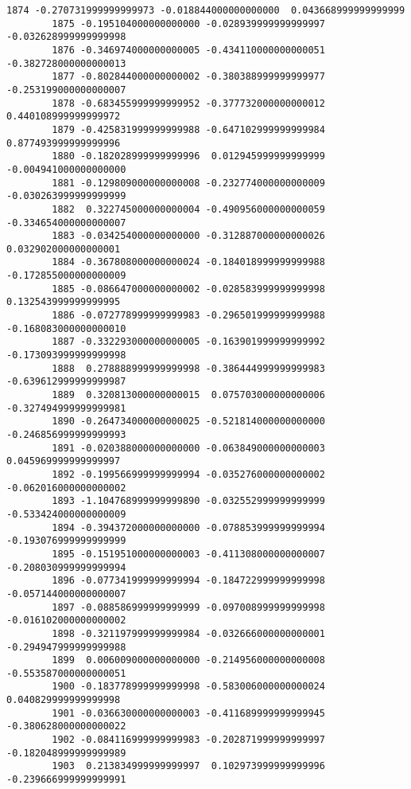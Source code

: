 \documentclass[11pt]{article}
\begin{document}
\begin{Verbatim}[commandchars=\\\{\}]
        1874 -0.270731999999999973 -0.018844000000000000  0.043668999999999999   
        1875 -0.195104000000000000 -0.028939999999999997 -0.032628999999999998   
        1876 -0.346974000000000005 -0.434110000000000051 -0.382728000000000013   
        1877 -0.802844000000000002 -0.380388999999999977 -0.253199000000000007   
        1878 -0.683455999999999952 -0.377732000000000012  0.440108999999999972   
        1879 -0.425831999999999988 -0.647102999999999984  0.877493999999999996   
        1880 -0.182028999999999996  0.012945999999999999 -0.004941000000000000   
        1881 -0.129809000000000008 -0.232774000000000009 -0.030263999999999999   
        1882  0.322745000000000004 -0.490956000000000059 -0.334654000000000007   
        1883 -0.034254000000000000 -0.312887000000000026  0.032902000000000001   
        1884 -0.367808000000000024 -0.184018999999999988 -0.172855000000000009   
        1885 -0.086647000000000002 -0.028583999999999998  0.132543999999999995   
        1886 -0.072778999999999983 -0.296501999999999988 -0.168083000000000010   
        1887 -0.332293000000000005 -0.163901999999999992 -0.173093999999999998   
        1888  0.278888999999999998 -0.386444999999999983 -0.639612999999999987   
        1889  0.320813000000000015  0.075703000000000006 -0.327494999999999981   
        1890 -0.264734000000000025 -0.521814000000000000 -0.246856999999999993   
        1891 -0.020388000000000000 -0.063849000000000003  0.045969999999999997   
        1892 -0.199566999999999994 -0.035276000000000002 -0.062016000000000002   
        1893 -1.104768999999999890 -0.032552999999999999 -0.533424000000000009   
        1894 -0.394372000000000000 -0.078853999999999994 -0.193076999999999999   
        1895 -0.151951000000000003 -0.411308000000000007 -0.208030999999999994   
        1896 -0.077341999999999994 -0.184722999999999998 -0.057144000000000007   
        1897 -0.088586999999999999 -0.097008999999999998 -0.016102000000000002   
        1898 -0.321197999999999984 -0.032666000000000001 -0.294947999999999988   
        1899  0.006009000000000000 -0.214956000000000008 -0.553587000000000051   
        1900 -0.183778999999999998 -0.583006000000000024  0.040829999999999998   
        1901 -0.036630000000000003 -0.411689999999999945 -0.380628000000000022   
        1902 -0.084116999999999983 -0.202871999999999997 -0.182048999999999989   
        1903  0.213834999999999997  0.102973999999999996 -0.239666999999999991   
        

\end{Verbatim}
\end{document}
